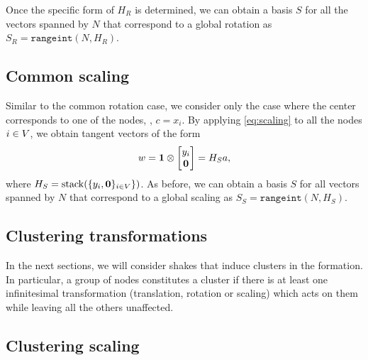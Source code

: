 \documentclass[12pt]{article}
\DeclareMathOperator{\rangespace}{range}
\newcommand{\kron}{\otimes}
\newcommand{\rangeint}{\texttt{rangeint}}
\begin{document}
Once the specific form of $H_R$ is determined, we can obtain a basis $S$ for all the vectors spanned by $N$ that correspond to a global rotation as $S_R=\rangeint(N,H_R)$.

\subsection{Common scaling}
Similar to the common rotation case, we consider only the case where the center corresponds to one of the nodes, \ie, $c=x_i$. By applying \eqref{eq:scaling} to all the nodes ${i \in V}$, we obtain tangent vectors of the form
\begin{equation}
  w=\vct{1}\kron\bmat{y_i\\\vct{0}}=H_Sa,
\end{equation}
where $H_S=\operatorname{stack}(\{y_i,\boldsymbol{0}\}_{i \in V}\})$. As before, we can obtain a basis $S$ for all vectors spanned by $N$ that correspond to a global scaling as $S_S=\rangeint(N,H_S)$.

\subsection{Clustering transformations}
In the next sections, we will consider shakes that induce clusters in the formation. In particular, a group of nodes constitutes a cluster if there is at least one infinitesimal transformation (translation, rotation or scaling) which acts on them while leaving all the others unaffected.




\subsection{Clustering scaling}
\end{document}
